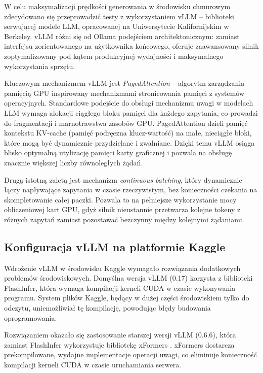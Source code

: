 W celu maksymalizacji prędkości generowania w środowisku chmurowym zdecydowano się przeprowadzić testy z wykorzystaniem vLLM \cite{vllm} -- biblioteki serwującej modele LLM, opracowanej na Uniwersytecie Kalifornijskim w Berkeley. vLLM różni się od Ollama podejściem architektonicznym: zamiast interfejsu zorientowanego na użytkownika końcowego, oferuje zaawansowany silnik zoptymalizowany pod kątem produkcyjnej wydajności i maksymalnego wykorzystania sprzętu.

Kluczowym mechanizmem vLLM jest \textit{PagedAttention} -- algorytm zarządzania pamięcią GPU inspirowany mechanizmami stronicowania pamięci z systemów operacyjnych. Standardowe podejście do obsługi mechanizmu uwagi \cite{attention_ml} w modelach LLM wymaga alokacji ciągłego bloku pamięci dla każdego zapytania, co prowadzi do fragmentacji i marnotrawstwa zasobów GPU. PagedAttention dzieli pamięć kontekstu KV-cache (pamięć podręczna klucz-wartość) na małe, nieciągłe bloki, które mogą być dynamicznie przydzielane i zwalniane. Dzięki temu vLLM osiąga blisko optymalną utylizację pamięci karty graficznej i pozwala na obsługę znacznie większej liczby równoległych żądań.

Drugą istotną zaletą jest mechanizm \textit{continuous batching}, który dynamicznie łączy napływające zapytania w czasie rzeczywistym, bez konieczności czekania na skompletowanie całej paczki. Pozwala to na pełniejsze wykorzystanie mocy obliczeniowej kart GPU, gdyż silnik nieustannie przetwarza kolejne tokeny z różnych zapytań zamiast pozostawać bezczynny między kolejnymi żądaniami.

\subsection*{Konfiguracja vLLM na platformie Kaggle}

Wdrożenie vLLM w środowisku Kaggle wymagało rozwiązania dodatkowych problemów środowiskowych. Domyślna wersja vLLM (0.17) korzysta z biblioteki FlashInfer, która wymaga kompilacji kerneli CUDA w czasie wykonywania programu. System plików Kaggle, będący w dużej części środowiskiem tylko do odczytu, uniemożliwiał tę kompilację, powodując błędy budowania oprogramowania.

Rozwiązaniem okazało się zastosowanie starszej wersji vLLM (0.6.6), która zamiast FlashInfer wykorzystuje bibliotekę xFormers \cite{xformers}. xFormers dostarcza prekompilowane, wydajne implementacje operacji uwagi, co eliminuje konieczność kompilacji kerneli CUDA w czasie uruchamiania serwera.


